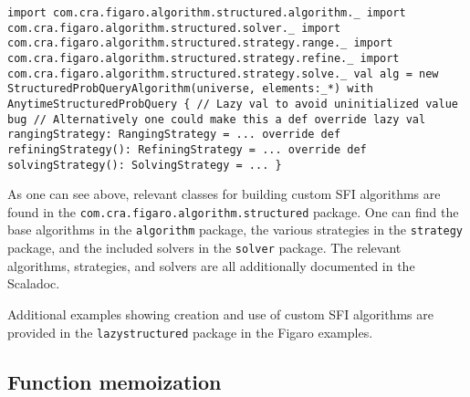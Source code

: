\begin{flushleft}
\texttt{import com.cra.figaro.algorithm.structured.algorithm.\_
\newline import com.cra.figaro.algorithm.structured.solver.\_
\newline import com.cra.figaro.algorithm.structured.strategy.range.\_
\newline import com.cra.figaro.algorithm.structured.strategy.refine.\_
\newline import com.cra.figaro.algorithm.structured.strategy.solve.\_
\newline
\newline val alg =
\newline\tab new StructuredProbQueryAlgorithm(universe, elements:\_*)
\newline\tab   with AnytimeStructuredProbQuery \{
\newline
\newline\tab   // Lazy val to avoid uninitialized value bug
\newline\tab   // Alternatively one could make this a def
\newline\tab   override lazy val rangingStrategy: RangingStrategy = ...
\newline
\newline\tab   override def refiningStrategy(): RefiningStrategy = ...
\newline
\newline\tab   override def solvingStrategy(): SolvingStrategy = ...
\newline\}
}
\end{flushleft}

As one can see above, relevant classes for building custom SFI algorithms are found in the \texttt{com.cra.figaro.algorithm.structured} package. One can find the base algorithms in the \texttt{algorithm} package, the various strategies in the \texttt{strategy} package, and the included solvers in the \texttt{solver} package. The relevant algorithms, strategies, and solvers are all additionally documented in the Scaladoc.

Additional examples showing creation and use of custom SFI algorithms are provided in the \texttt{lazystructured} package in the Figaro examples. 

\subsection{Function memoization}
\label{FunctionMemoization}

